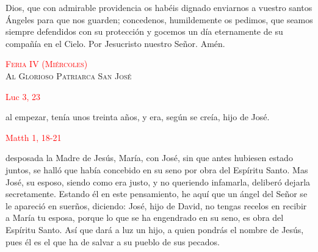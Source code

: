 \documentclass[10pt]{article}
\begin{document}
\begin{multicols}{2}
      \begin{otherlanguage}{latin}
            

            \vspace{1mm}

            

            \vspace{1mm}

            
      \end{otherlanguage}

      \vspace{2mm}

      Dios, que con admirable providencia os habéis dignado enviarnos a vuestro santos Ángeles para que nos guarden; concedenos, humildemente os pedimos,
      que seamos siempre defendidos con su protección y gocemos un día eternamente de su compañía en el Cielo. Por Jesucristo nuestro Señor. Amén.


      \begin{center}
            \textsc{\textcolor{red}{Feria IV (Miércoles)}\\ {\large Al Glorioso Patriarca San José}}
      \end{center}

      \hfill\textcolor{red}{Luc 3, 23}

      al empezar, tenía unos treinta años, y era, según se creía, hijo de José.

      \vspace{2mm}

      \hfill\textcolor{red}{Matth 1, 18-21}

      desposada la Madre de Jesús, María, con José, sin que antes hubiesen estado juntos, se halló que había concebido en su seno por obra del Espíritu Santo. Mas José, su esposo,
      siendo como era justo, y no queriendo infamarla, deliberó dejarla secretamente. Estando él en este pensamiento, he aquí que un ángel del Señor se le apareció en suerños, diciendo:
      José, hijo de David, no tengas recelos en recibir a María tu esposa, porque lo que se ha engendrado en su seno, es obra del Espíritu Santo. Así que dará a luz un hijo, a quien pondrás
      el nombre de Jesús, pues él es el que ha de salvar a su pueblo de sus pecados.
      \vspace{2mm}


\end{multicols}
\end{document}

